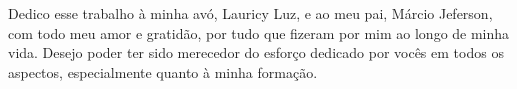 
\chapter*{}
\vspace{15cm}
\begin{flushright}
Dedico esse trabalho à minha avó, Lauricy Luz, e ao meu pai, Márcio Jeferson, com todo meu amor e gratidão, por tudo que fizeram por mim ao longo de minha vida. Desejo poder ter sido merecedor do esforço dedicado por vocês em todos os aspectos, especialmente quanto à minha formação.
\end{flushright}